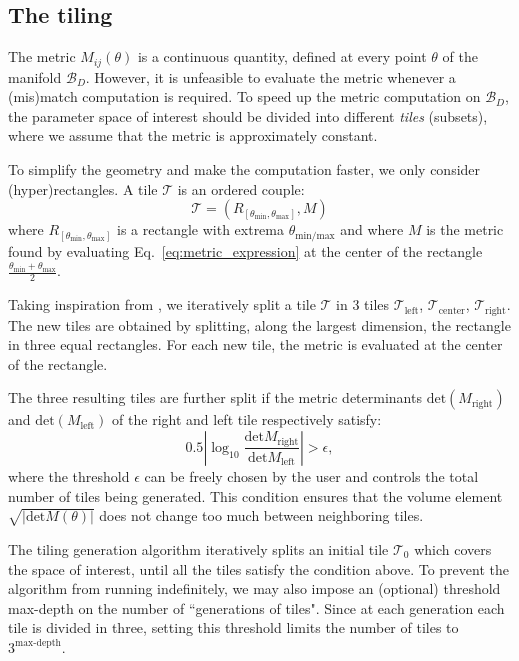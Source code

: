 \documentclass[twocolumn,showpacs,preprintnumbers,nofootinbib,prd,
superscriptaddress,10pt]{revtex4-2}
\begin{document}
\subsection{The tiling} \label{sec:tiling}

The metric $M_{ij}(\theta)$ is a continuous quantity, defined at every point $\theta$ of the manifold $\mathcal{B}_D$.
However, it is unfeasible to evaluate the metric whenever a (mis)match computation is required.
To speed up the metric computation on $\mathcal{B}_D$, the parameter space of interest should be divided into different {\it tiles} (subsets), where we assume that the metric is approximately constant.

To simplify the geometry and make the computation faster, we only consider (hyper)rectangles. A tile $\mathcal{T}$ is an ordered couple:
\begin{equation} \label{eq:tile}
	\mathcal{T} = \left(R_{[\theta_\text{min}, \theta_\text{max}]}, M \right)
\end{equation}
where $R_{[\theta_\text{min}, \theta_\text{max}]}$ is a rectangle with extrema $\theta_{\text{min/max}}$ and where $M$ is the metric found by evaluating Eq.~\eqref{eq:metric_expression} at the center of the rectangle $\frac{\theta_\text{min}+\theta_\text{max}}{2}$.

Taking inspiration from \cite{Hanna:2022zpk}, we iteratively split a tile $\mathcal{T}$ in 3 tiles $\mathcal{T}_\text{left}$, $\mathcal{T}_\text{center}$, $\mathcal{T}_\text{right}$. The new tiles are obtained by splitting, along the largest dimension, the rectangle in three equal rectangles. For each new tile, the metric is evaluated at the center of the rectangle.

The three resulting tiles are further split if the metric determinants $\text{det}\left(M_\text{right}\right)$ and $\text{det}\left(M_\text{left}\right)$ of the right and left tile respectively satisfy:
\begin{equation}\label{eq:stop_tiling}
	0.5\left|\log_{\textrm{10}}\frac{\text{det} M_\text{right}}{\text{det}M_\text{left}}\right| > \epsilon,
\end{equation}
where the threshold $\epsilon$ can be freely chosen by the user and controls the total number of tiles being generated.
This condition ensures that the volume element $\sqrt{|\text{det}M(\theta)|}$ does not change too much between neighboring tiles.

The tiling generation algorithm iteratively splits an initial tile $\mathcal{T}_{0}$ which covers the space of interest, until all the tiles satisfy the condition above.
To prevent the algorithm from running indefinitely, we may also impose an (optional) threshold max-depth on the number of ``generations of tiles". Since at each generation each tile is divided in three, setting this threshold limits the number of tiles to $3^{\textrm{max-depth}}$.
\end{document}
